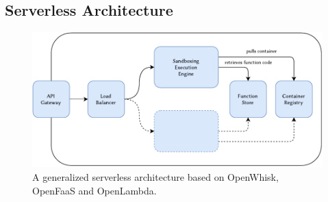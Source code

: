 \subsection{Serverless Architecture}

\begin{figure}
    \includegraphics[width=\textwidth]{figures/ServerlessArchitecture.pdf}
    \caption{A generalized serverless architecture based on OpenWhisk, OpenFaaS and OpenLambda.}
    \label{fig:serverless-architecture}
\end{figure}

